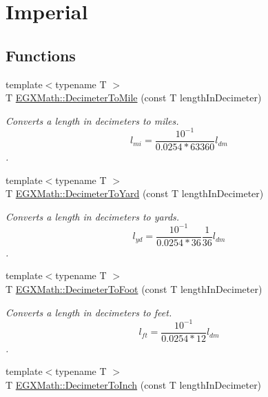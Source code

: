 \hypertarget{group___e_g_x_math-_conversions-_length_conversions-_decimeter-_imperial}{}\section{Imperial}
\label{group___e_g_x_math-_conversions-_length_conversions-_decimeter-_imperial}
\subsection*{Functions}
\begin{DoxyCompactItemize}
\item 
{\footnotesize template$<$typename T $>$ }\\T \mbox{\hyperlink{group___e_g_x_math-_conversions-_length_conversions-_decimeter-_imperial_gab7d9d207fb6aa53999300baf5d9cea16}{E\+G\+X\+Math\+::\+Decimeter\+To\+Mile}} (const T length\+In\+Decimeter)
\begin{DoxyCompactList}\small\item\em Converts a length in decimeters to miles. \[ l_{mi}=\frac{10^{-1}}{0.0254 * 63360} l_{dm} \]. \end{DoxyCompactList}\item 
{\footnotesize template$<$typename T $>$ }\\T \mbox{\hyperlink{group___e_g_x_math-_conversions-_length_conversions-_decimeter-_imperial_ga2ffbd73da0cc3cbb36822127433e3267}{E\+G\+X\+Math\+::\+Decimeter\+To\+Yard}} (const T length\+In\+Decimeter)
\begin{DoxyCompactList}\small\item\em Converts a length in decimeters to yards. \[ l_{yd}= \frac{10^{-1}}{0.0254 * 36} \frac{1}{36} l_{dm} \]. \end{DoxyCompactList}\item 
{\footnotesize template$<$typename T $>$ }\\T \mbox{\hyperlink{group___e_g_x_math-_conversions-_length_conversions-_decimeter-_imperial_gaf86c80f8ce1e5ab6113a2a912c1f446e}{E\+G\+X\+Math\+::\+Decimeter\+To\+Foot}} (const T length\+In\+Decimeter)
\begin{DoxyCompactList}\small\item\em Converts a length in decimeters to feet. \[ l_{ft}= \frac{10^{-1}}{0.0254 * 12} l_{dm} \]. \end{DoxyCompactList}\item 
{\footnotesize template$<$typename T $>$ }\\T \mbox{\hyperlink{group___e_g_x_math-_conversions-_length_conversions-_decimeter-_imperial_ga51bb6347b1c3ca746b7a3eadc3852e37}{E\+G\+X\+Math\+::\+Decimeter\+To\+Inch}} (const T length\+In\+Decimeter)

\end{DoxyCompactItemize}
